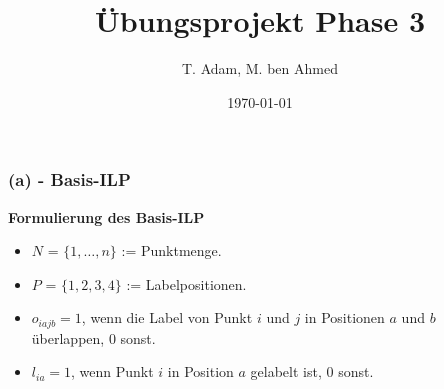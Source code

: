 \documentclass[aspectratio=169]{beamer}
\title[Übungsprojekt Phase 3]{Übungsprojekt Phase 3} %
\author{T. Adam, M. ben Ahmed} %
\institute[UOS] %
{

Universität Osnabrück \\ %

\medskip
\textit{Æ} %


}
\date{\today} %
\begin{document}
\begin{frame}
\titlepage %
\end{frame}





\begin{frame}
	\frametitle{(a) - Basis-ILP}
	\textbf{Formulierung des Basis-ILP}\\
	\begin{itemize}
		\item $N$	= $ \{1,\dotsc,n\}$ := Punktmenge.
		\item $P$ = $ \{1,2,3,4\}$ := Labelpositionen.
		\item $o_{iajb} = 1$, wenn die Label von Punkt $i$ und $j$ in Positionen $a$ und $b$ überlappen, $0$ sonst.
		\item $l_{ia} = 1$, wenn Punkt $i$ in Position $a$ gelabelt ist, 0 sonst.
	\end{itemize}
	\end{frame}
\end{document}
